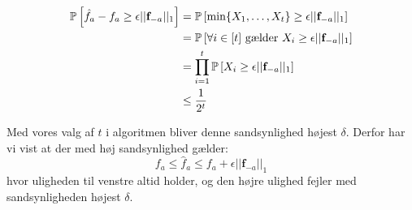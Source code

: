 \begin{align}
  \P{\hat f_a - f_a \geq \epsilon ||\mathbf f_{-a}||_1}
  &= \P{\min\{X_1, \dots, X_t\} \geq \epsilon ||\mathbf f_{-a}||_1}\\
  &= \P{\forall i \in [t] \text{ gælder } X_i \geq \epsilon ||\mathbf f_{-a}||_1}\\
  &= \prod_{i=1}^t \P{X_i \geq \epsilon ||\mathbf f_{-a}||_1}\\
  &\leq \frac{1}{2^t}
\end{align}

Med vores valg af $t$ i algoritmen bliver denne sandsynlighed højest $\delta$. Derfor har vi vist at der med høj sandsynlighed gælder:
$$
  f_a \leq \hat f_a \leq f_a + \epsilon ||\mathbf f_{-a}||_1
$$
hvor uligheden til venstre altid holder, og den højre ulighed fejler med sandsynligheden højest $\delta$.




